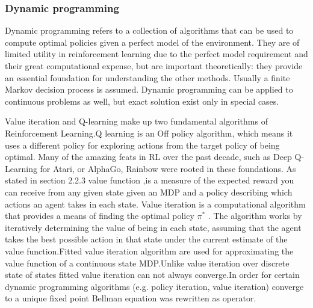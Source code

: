 \subsubsection{Dynamic programming}
Dynamic programming refers to a collection of algorithms that can be used
to compute optimal policies given a perfect model of the environment.
They are of limited utility in reinforcement learning due to the perfect model requirement 
and their great computational expense, but are important theoretically:
they provide an essential foundation for understanding the other methods.
Usually a finite Markov decision process is assumed. Dynamic programming can be applied to continuous 
problems as well, but exact solution exist only in special cases.

Value iteration and Q-learning make up two fundamental algorithms of
Reinforcement Learning.Q learning is an Off policy algorithm, which means it
uses a different policy for exploring actions from the target policy of being
optimal.  Many of the amazing feats in RL over the past decade, such as Deep
Q-Learning for Atari, or AlphaGo, Rainbow were rooted in these foundations. As
stated in section 2.2.3 value function ,is a measure of the expected reward you
can receive from any given state  given an MDP and a policy describing which
actions an agent takes in each state. Value iteration is a computational
algorithm that provides a means of finding the optimal policy $ \pi^{ * }$ .
The algorithm works by iteratively determining the value of being in each
state,  assuming that the agent takes the best possible action in that state
under the current estimate of the value function.Fitted value iteration
algorithm  are used for approximating the value function of a continuous state
MDP.Unlike value iteration over discrete state of states fitted value iteration
can not always converge.In order for certain dynamic programming algorithms
(e.g. policy iteration, value iteration) converge to a unique fixed point
Bellman equation  was rewritten as operator.


